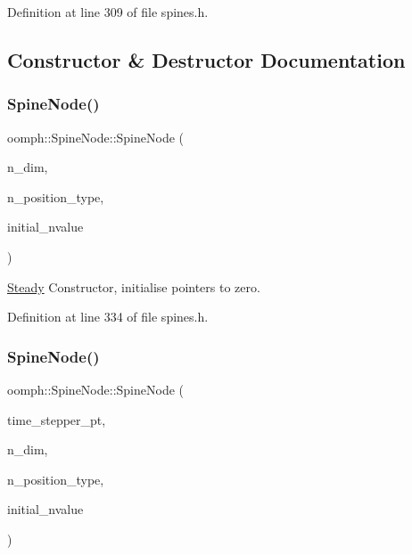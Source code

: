 Definition at line 309 of file spines.\+h.



\subsection{Constructor \& Destructor Documentation}
\mbox{\label{classoomph_1_1SpineNode_af2bbfcecaae18b9256de02a0f0a9bddd}} 
\subsubsection{\texorpdfstring{Spine\+Node()}{SpineNode()}\hspace{0.1cm}{\footnotesize\ttfamily [1/2]}}
{\footnotesize\ttfamily oomph\+::\+Spine\+Node\+::\+Spine\+Node (\begin{DoxyParamCaption}\item[{const unsigned \&}]{n\+\_\+dim,  }\item[{const unsigned \&}]{n\+\_\+position\+\_\+type,  }\item[{const unsigned \&}]{initial\+\_\+nvalue }\end{DoxyParamCaption})\hspace{0.3cm}{\ttfamily [inline]}}



\hyperlink{classoomph_1_1Steady}{Steady} Constructor, initialise pointers to zero. 



Definition at line 334 of file spines.\+h.

\mbox{\label{classoomph_1_1SpineNode_a35d835d5f7b549f45b69669044e30545}} 
\subsubsection{\texorpdfstring{Spine\+Node()}{SpineNode()}\hspace{0.1cm}{\footnotesize\ttfamily [2/2]}}
{\footnotesize\ttfamily oomph\+::\+Spine\+Node\+::\+Spine\+Node (\begin{DoxyParamCaption}\item[{\hyperlink{classoomph_1_1TimeStepper}{Time\+Stepper} $\ast$const \&}]{time\+\_\+stepper\+\_\+pt,  }\item[{const unsigned \&}]{n\+\_\+dim,  }\item[{const unsigned \&}]{n\+\_\+position\+\_\+type,  }\item[{const unsigned \&}]{initial\+\_\+nvalue }\end{DoxyParamCaption})\hspace{0.3cm}{\ttfamily [inline]}}



